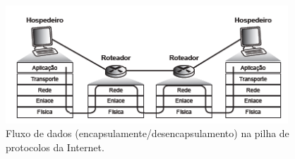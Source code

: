 \documentclass[	12pt, Times, openright, twoside, a4paper, english, brazil]{abntex2}
\begin{document}
\begin{figure}[ht!]
    \begin{center}  
    \includegraphics[width=300pt]{pilha-protocolo.png}
    \caption{Fluxo de dados (encapsulamente/desencapsulamento) na pilha de protocolos da Internet.  \cite[Adaptado]{KR09}}
    \label{fig:pilha_protocolos}
    \end{center}
\end{figure}



\end{document}
